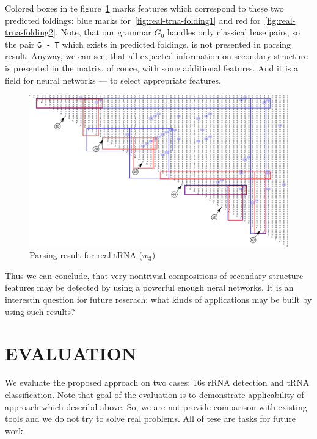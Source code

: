 \documentclass[a4paper,twoside]{article}
\begin{document}
Colored boxes in te figure~\ref{fig:real-trna} marks features which correspond to these two predicted foldings: blue marks for~\ref{fig:real-trna-folding1} and red for~\ref{fig:real-trna-folding2}.
Note, that our grammar $G_0$ handles only classical base pairs, so the pair \verb|G - T| which exists in predicted foldings, is not presented in parsing result.
Anyway, we can see, that all expected information on secondary structure is presented in the matrix, of couce, with some additional features.
And it is a field for neural networks --- to select apprepriate features.

\begin{figure}
\centering
\includegraphics[width=.98\textwidth]{figures/0m.pdf}
\caption{Parsing result for real tRNA ($w_3$)}
\label{fig:real-trna}
\end{figure}

Thus we can conclude, that very nontrivial compositions of secondary structure features may be detected by using a powerful enough neral networks.
It is an interestin question for future reserach: what kinds of applications may be built by using such results?


\section{\uppercase{Evaluation}}
\label{sec:evaluation}

\noindent We evaluate the proposed approach on two cases: 16s rRNA detection and tRNA classification.
Note that goal of the evaluation is to demonstrate applicability of approach which describd above.
So, we are not provide comparison with existing tools and we do not try to solve real problems.
All of tese are tasks for future work.
\end{document}
